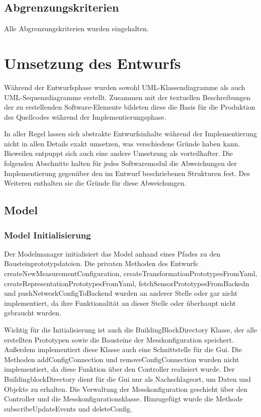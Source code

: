 \documentclass[parskip=full]{scrartcl}
\begin{document}
\subsection{Abgrenzungskriterien}

Alle Abgrenzungskriterien wurden eingehalten.

\clearpage
\section{Umsetzung des Entwurfs}

Während der Entwurfsphase wurden sowohl UML-Klassendiagramme als auch UML-Sequenzdiagramme erstellt. Zusammen mit der textuellen Beschreibungen der zu erstellenden Software-Elemente bildeten diese die Basis für die Produktion des Quellcodes während der Implementierungsphase. 

In aller Regel lassen sich abstrakte Entwurfsinhalte während der Implementierung nicht in allen Details exakt umsetzen, was verschiedene Gründe haben kann. Bisweilen entpuppt sich auch eine andere Umsetzung als vorteilhafter. Die folgenden Abschnitte halten für jedes Softwaremodul die Abweichungen der Implementierung gegenüber den im Entwurf beschriebenen Strukturen fest. Des Weiteren enthalten sie die Gründe für diese Abweichungen. 
\clearpage

\subsection{Model}

\subsubsection{Model Initialisierung}
Der Modelmanager initialisiert das Model anhand eines Pfades zu den Bausteinprototypdateien. Die privaten Methoden des Entwurfs createNewMeasurementConfiguration, createTransformationPrototypesFromYaml, createRepresentationPrototypesFromYaml, fetchSensorPrototypesFromBackedn und pushNetworkConfigToBackend wurden an anderer Stelle oder gar nicht implementiert, da ihre Funktionalität an dieser Stelle oder überhaupt nicht gebraucht wurden.

Wichtig für die Initialisierung ist auch die BuildingBlockDirectory Klasse, der alle erstellten Prototypen sowie die Bausteine der Messkonfiguration speichert. Außerdem implementiert diese Klasse auch eine Schnittstelle für die Gui. Die Methoden addConfigConnection und removeConfigConnection wurden nicht implementiert, da diese Funktion über den Controller realisiert wurde. Der BuildingblockDirectory dient für die Gui nur als Nachschlageort, um Daten und Objekte zu erhalten. Die Verwaltung der Messkonfiguration geschieht über den Controller und die Messkonfigurationsklasse. Hinzugefügt wurde die Methode subscribeUpdateEvents und deleteConfig.
\end{document}

